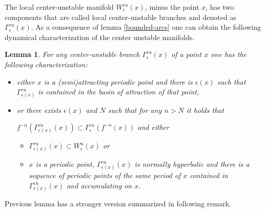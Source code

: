 \documentclass[a4paper,11pt]{article}
\newtheorem{lemma}{Lemma}
\theoremstyle{definition}
\def\La{\Lambda}
\def\e{\epsilon}
\def\Ga{\Gamma}
\def\La{\Lambda}
\def\Ga{\Gamma}
\begin{document}

The local center-unstable manifold $W^{cu}_\e(x)$, minus the point $x$, has two components that are called local center-unstable branches and denoted as $\Ga^{cu}_\e(x)$. As a consequence of lemma \ref{bounded-arcs} one can obtain the following dynamical characterization of the center  unstable  manifolds.

\begin{lemma}\label{centerunstable}
For any center-unstable branch $\Ga^{cu}_\e(x)$ of a point $x$ one has the following characterization:






\begin{itemize}

    \item[--] either $x$ is a (semi)attracting periodic point and there is $\e(x)$ such that $\Ga^{cu}_{\e(x)}$ is contained in the basin of attraction of that point, 


    \item[--] or there exists $\e(x)$ and $N$ such that for any $n> N$ it holds that 
 
    
    $f^{-n}(\Ga^{cu}_{\e(x)}(x))\subset \Ga^{cu}_\e(f^{-n}(x))$ and either
    \begin{itemize}
        \item $\Ga^{cu}_{\e(x)}(x)\subset W^u_\e(x)$ or

        \item $x$ is a periodic point, $\Ga^{cu}_{\e(x)}(x)$ is normally hyperbolic  and there is a sequence of periodic points of the same period of $x$ contained in $\Ga^{cu}_{\e(x)}(x)$ and accumulating on $x.$
        
    \end{itemize}
    

    
\end{itemize}

\end{lemma}

Previous lemma has a stronger version summarized in following remark.
\end{document}
